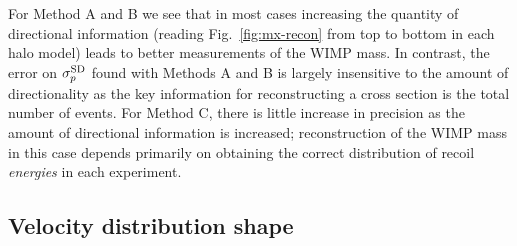 For Method A and B we see that in most cases increasing the quantity of directional information (reading Fig.~\ref{fig:mx-recon} from top to bottom in each halo model) leads to better measurements of the WIMP mass. In contrast, the error on $\sigma_p^{\rm SD}$ found with Methods A and B is largely insensitive to the amount of directionality as the key information for reconstructing a cross section is the total number of events. For Method C, there is little increase in precision as the amount of directional information is increased; reconstruction of the WIMP mass in this case depends primarily on obtaining the correct distribution of recoil {\it energies} in each experiment. 

\subsection{Velocity distribution shape}\label{sec:directional_shape}
